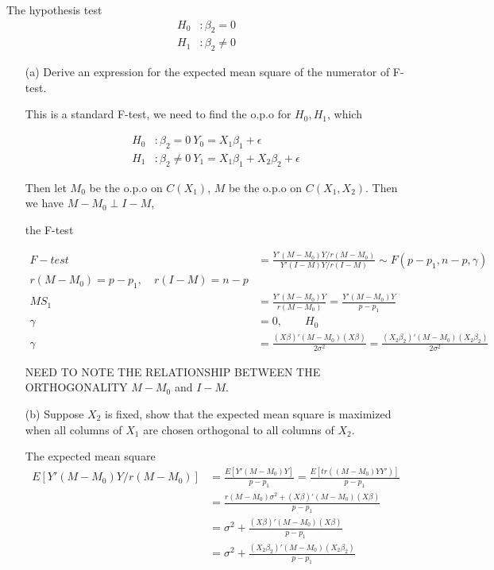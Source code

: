 The hypothesis test
\begin{align*}
H_0 &: \beta_2 = 0 \\
H_1 &: \beta_2 \neq 0
\end{align*}

\begin{itemize}
\item[(a)] Derive an expression for the expected mean square of the numerator of F-test.

This is a standard F-test, we need to find the o.p.o for $H_0, H_1$, which 

\begin{align*}
H_0 &: \beta_2 = 0 \
Y_0 = X_1 \beta_1 + \epsilon \\
H_1 &: \beta_2 \neq 0 \
Y_1 = X_1 \beta_1 + X_2 \beta_2 + \epsilon
\end{align*}

Then let $M_0$ be the o.p.o on $C(X_1)$, $M$ be the o.p.o on $C(X_1, X_2)$. Then we have $M-M_0 \perp I-M$, 

the F-test

\begin{align*}
F-test &= \frac{Y' (M-M_0) Y \Big / r(M- M_0)}{Y' (I - M) Y \Big / r(I - M)} \sim F(p-p_1, n-p, \gamma)\\
r(M-M_0) = p-p_1, \quad r(I-M) = n-p \\
MS_1 &= \frac{Y' (M-M_0) Y }{r(M- M_0)} =  \frac{Y' (M-M_0) Y }{p - p_1} \\
\gamma &= 0 , \qquad H_0\\
\gamma &= \frac{(X\beta)' (M-M_0) (X \beta)}{2 \sigma^2} = \frac{(X_2 \beta_2)' (M-M_0) (X_2 \beta_2)}{2 \sigma^2}
\end{align*}

NEED TO NOTE THE RELATIONSHIP BETWEEN THE ORTHOGONALITY $M-M_0$ and $I-M$. 

\item[(b)] Suppose $X_2$ is fixed, show that the expected mean square is maximized when all columns of $X_1$ are chosen orthogonal to all columns of $X_2$.

The expected mean square
\begin{align*}
E [ Y' (M-M_0) Y \Big / r(M- M_0) ] &= \frac{E[ Y' (M-M_0) Y] }{p-p_1} = \frac{E[tr( (M-M_0) Y Y')] }{p-p_1} \\
&= \frac{ r(M-M_0) \sigma^2 + (X\beta)' (M-M_0) (X\beta)}{p-p_1} \\ 
&= \sigma^2 + \frac{(X\beta)' (M-M_0) (X\beta)}{p-p_1} \\
&= \sigma^2 + \frac{(X_2 \beta_2)' (M-M_0) (X_2 \beta_2)}{p-p_1} 
\end{align*}


\end{itemize}
